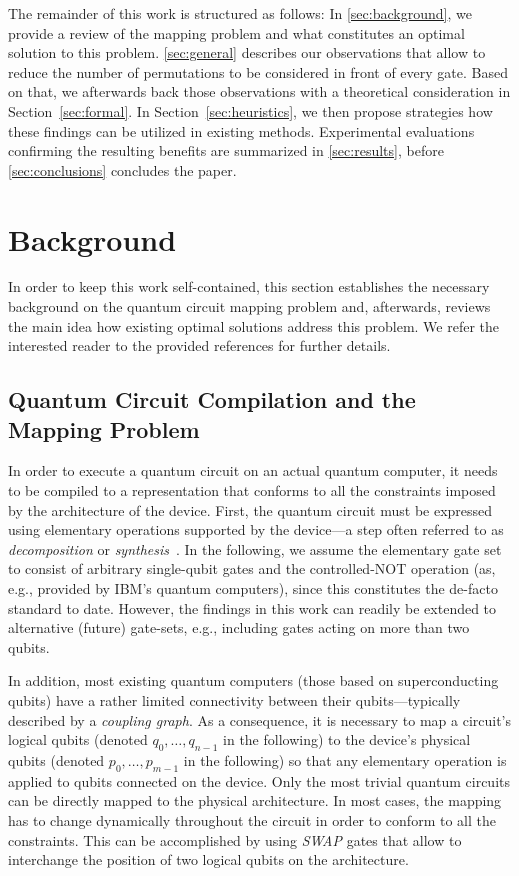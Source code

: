 \documentclass[10pt,conference]{IEEEtran}
\begin{document}
The remainder of this work is structured as follows: 
In \autoref{sec:background}, we provide a review of the mapping problem and what constitutes an optimal solution to this problem.
\autoref{sec:general} describes our observations that allow to reduce the number of permutations to be considered in front of every gate. 
Based on that, we afterwards back those observations with a theoretical consideration in Section~\ref{sec:formal}.
In Section~\ref{sec:heuristics}, we then propose strategies how these findings can be utilized in existing methods.
Experimental evaluations confirming the resulting benefits are summarized in \autoref{sec:results}, before \autoref{sec:conclusions} concludes the paper.

\section{Background}\label{sec:background}
In order to keep this work self-contained, this section establishes the necessary background on the quantum circuit mapping problem and, afterwards, reviews the main idea how existing optimal solutions address this problem. We refer the interested reader to the provided references for further details.

\subsection{Quantum Circuit Compilation and the Mapping Problem}\label{sec:mapping}

In order to execute a quantum circuit on an actual quantum computer, it needs to be compiled to a representation that conforms to all the constraints imposed by the architecture of the device. 
First, the quantum circuit must be expressed using elementary operations supported by the device---a step often referred to as \emph{decomposition} or \emph{synthesis}~\cite{barencoElementaryGatesQuantum1995, maslovAdvantagesUsingRelative2016,willeImprovingMappingReversible2013,degriendArchitectureawareSynthesisPhase2020}.
In the following, we assume the elementary gate set to consist of arbitrary single-qubit gates and the controlled-NOT operation (as, e.g., provided by IBM's quantum computers), since this constitutes the de-facto standard to date.
However, the findings in this work can readily be extended to alternative (future) gate-sets, e.g., including gates acting on more than two qubits.
 
In addition, most existing quantum computers (those based on superconducting qubits) have a rather limited connectivity between their qubits---typically described by a \emph{coupling graph}.
As a consequence, it is necessary to map a circuit's logical qubits (denoted $q_0,\dots,q_{n-1}$ in the following) to the device's physical qubits (denoted $p_0,\dots,p_{m-1}$ in the following) so that any elementary operation is applied to qubits connected on the device.
Only the most trivial quantum circuits can be directly mapped to the physical architecture.
In most cases, the mapping has to change dynamically throughout the circuit in order to conform to all the constraints.
This can be accomplished by using \textit{SWAP} gates that allow to interchange the position of two logical qubits on the architecture.
\end{document}
